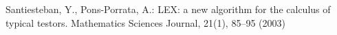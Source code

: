 \documentclass[citeauthoryear]{llncs}
\begin{document}
\begin{thebibliography}{}
	Santiesteban, Y., Pons-Porrata, A.:
	LEX: a new algorithm for the calculus of typical testors. 
	Mathematics Sciences Journal, 21(1), 85--95 (2003)

	
	
\end{thebibliography}

%
\end{document}
